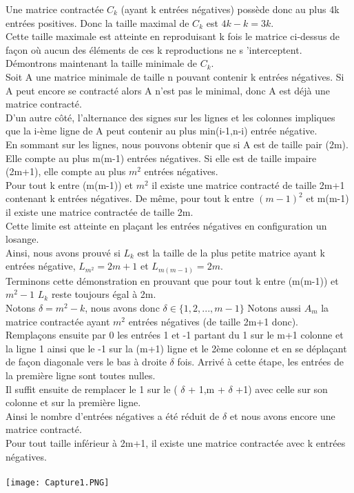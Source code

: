 \documentclass{book}
\begin{document}
   Une matrice contractée $C_k$ (ayant k entrées négatives) possède donc au plus 4k entrées positives. Donc la taille maximal de $C_k$ est $4k-k=3k$.\\ Cette taille maximale est atteinte en reproduisant k fois le matrice ci-dessus de façon où aucun des éléments de ces k reproductions ne s 'interceptent. \\
   Démontrons maintenant la taille minimale de $C_k$.\\
   Soit A une matrice minimale de taille n pouvant contenir k entrées négatives. Si A peut encore se contracté alors A n'est pas le minimal, donc A est déjà une matrice contracté.\\
   D'un autre côté, l'alternance des signes sur les lignes et les colonnes impliques que la i-ème ligne de A peut contenir au plus min(i-1,n-i) entrée négative.\\
   En sommant sur les lignes, nous pouvons obtenir que si A est de taille pair (2m). Elle compte au plus m(m-1) entrées négatives. Si elle est de taille impaire (2m+1), elle compte au plus $m^2$ entrées négatives.\\
   Pour tout k entre (m(m-1)) et $m^2$ il existe une matrice contracté de taille 2m+1 contenant k entrées négatives. De même, pour tout k entre $(m-1)^2$ et m(m-1) il existe une matrice contractée de taille 2m.\\
   Cette limite est atteinte en plaçant les entrées négatives en configuration un losange.\\
   Ainsi, nous avons prouvé si $L_k$ est la taille de la plus petite matrice ayant k entrées négative, $L_{m^2}=2m+1$ et $L_{m(m-1)}=2m$. \\ Terminons cette démonstration en prouvant que pour tout k entre (m(m-1)) et $m^2-1$ $L_k$ reste toujours égal à 2m. \\
   Notons $\delta = m^2-k$, nous avons donc $\delta \in \{ 1, 2, ... , m-1 \}$ Notons aussi $A_m$ la matrice contractée ayant $m^2$ entrées négatives (de taille 2m+1 donc).\\
   Remplaçons ensuite par 0 les entrées 1 et -1 partant du 1 sur le m+1 colonne et la ligne 1 ainsi que le -1 sur la (m+1) ligne et le 2ème colonne et en se déplaçant de façon diagonale vers le bas à droite $\delta$ fois. Arrivé à cette étape, les entrées de la première ligne sont toutes nulles.\\
   Il suffit ensuite de remplacer le 1 sur le ( $\delta$ + 1,m + $\delta$ +1) avec celle sur son colonne et sur la première ligne. \\
   Ainsi le nombre d'entrées négatives a été réduit de $\delta$ et nous avons encore une matrice contracté.\\ Pour tout taille inférieur à 2m+1, il existe une matrice contractée avec k entrées négatives.  \\\\ 
   \texttt{[image: Capture1.PNG]}
\end{document}
